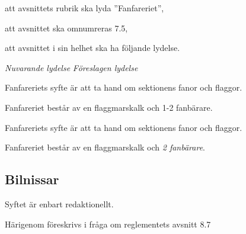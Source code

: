 \documentclass{article}
\newenvironment{lydelse}
    {\begin{paracol}{2}%
        \emph{Nuvarande lydelse}%
        \switchcolumn%
        \emph{Föreslagen lydelse}%
    \end{paracol}%
    \begin{enumerate}[label=\thesubsection.\arabic*]%
    \begin{paracol}{2}%
    }{\end{paracol}\end{enumerate}}
\begin{document}
\begin{dels}
    \item att avsnittets rubrik ska lyda ''Fanfareriet'',
    \item att avsnittet ska omnumreras 7.5,
    \item att avsnittet i sin helhet ska ha följande lydelse.
\end{dels}
\begin{lydelse}
    \setcounter{section}{8}
    \setcounter{subsection}{6}
    
    \item Fanfareriets syfte är att ta hand om sektionens fanor och flaggor.

	\item Fanfareriet består av en flaggmarskalk och 1-2 fanbärare.
    
    \setcounter{section}{7}
    \setcounter{subsection}{5}
    \switchcolumn
    
    \item Fanfareriets syfte är att ta hand om sektionens fanor och flaggor.

    \item Fanfareriet består av en flaggmarskalk och \emph{2 fanbärare}.
    
\end{lydelse}

\subsection{Bilnissar}
Syftet är enbart redaktionellt.

Härigenom föreskrivs i fråga om reglementets avsnitt 8.7
\end{document}
